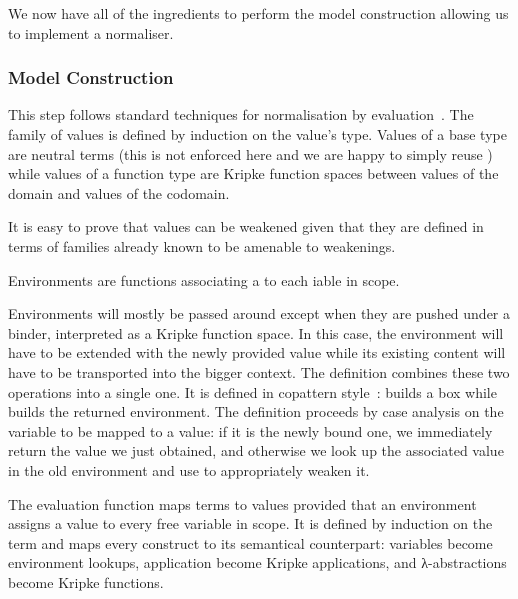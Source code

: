 \documentclass{article}
\begin{document}

We now have all of the ingredients to perform the model
construction allowing us to implement a normaliser.

\subsubsection{Model Construction}

This step follows standard techniques for normalisation
by evaluation~\cite{DBLP:conf/lics/BergerS91,DBLP:journals/mscs/CoquandD97,DBLP:journals/lisp/Coquand02}.
The family of values is defined by induction on the value's
type.
%
Values of a base type are neutral terms (this is not enforced here and
we are happy to simply reuse ) while values of a function type
are Kripke function spaces between values of the domain and values of
the codomain.


It is easy to prove that values can be weakened given that they are
defined in terms of families already known to be amenable to weakenings.


Environments are functions associating a 
to each iable in scope.


Environments will mostly be passed around except when they are pushed
under a binder, interpreted as a Kripke function space.
%
In this case, the environment will have to be extended with the newly
provided value while its existing content will have to be transported
into the bigger context.
%
The  definition combines these two operations into a single
one. It is defined in copattern style~\cite{DBLP:conf/popl/AbelPTS13}:
{} builds a box while {} builds the
returned environment. The definition proceeds by case analysis on the
variable to be mapped to a value: if it is the newly bound one, we
immediately return the value we just obtained, and otherwise we look
up the associated value in the old environment and use  to
appropriately weaken it.


The evaluation function maps terms to values provided that
an environment assigns a value to every free variable in scope.
It is defined by induction on the term and maps every construct
to its semantical counterpart: variables become environment lookups,
application become Kripke applications, and λ-abstractions become
Kripke functions.
\end{document}
